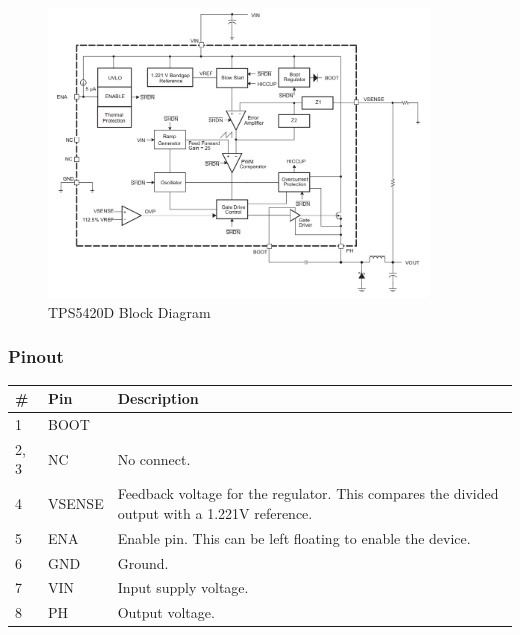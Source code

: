 \begin{figure}[h]
        \centering
        \includegraphics[width=0.9\textwidth]{data/tps5420d-block-diagram}
        \caption{TPS5420D Block Diagram}
        \label{fig:tps5420d-block}
\end{figure}

\subsubsection{Pinout}
\label{sec:tps5420d-pinout}

\label{tab:tps5420d-pinout}
\begin{tabularx}{\textwidth}{l l X}
        \caption{TPS5420D pinout.}                                                               \\
        \toprule
        \textbf{\#} & \textbf{Pin} & \textbf{Description}                                        \\
        \midrule
        1           & BOOT         &                                                             \\
        2, 3        & NC           & No connect.                                                 \\
        4           & VSENSE       & Feedback voltage for the regulator. This compares the divided output with a 1.221V
        reference.                                                                               \\
        5           & ENA          & Enable pin. This can be left floating to enable the device. \\
        6           & GND          & Ground.                                                     \\
        7           & VIN          & Input supply voltage.                                       \\
        8           & PH           & Output voltage.                                             \\
        \bottomrule
\end{tabularx}

